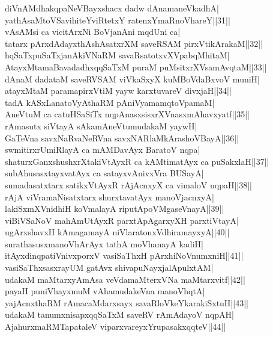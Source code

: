 \documentclass{article}
\begin{document}
diVnAMdhakqpaNeVBayxshacx dadw dAnamaneVkadhA|\\
yathAsaMtoVSavihiteYviRtetxY ratenxYmaRnoVhareY||31||\\
vAsAMsi ca vicitArxNi BoVjanAni mqdUni ca|\\
tatarx pArxdAdayxthAshAsatxrXM saveRSAM pirxVtikArakaM||32||\\
hqSaTxpuSaTxjanAkiVNaRM savaRsatotxvXVpabqMhitaM|\\
AtayxMtamaBavadadhxqqSaTxM puraM puMsitxrXVsamAvqtaM||33||\\
dAnaM dadataM saveRVSAM viVkaSxyX kuMBoVdaBxvoV muniH|\\
atayxMtaM paramapirxVtiM yayw karxtuvareV divxjaH||34||\\
tadA kASxLanatoVyAthaRM pAniVyamamqtoVpamaM|\\
AneVtuM ca catuHSaSiTx nqpAnasxsisxrXVnasxmAhavxyatf||35||\\
rAmasutx siVtayA sAkamAneVtumudakaM yaywH|\\
GaTeVna savxNaRvaNeRVna savxNARlaMkArashoVBayA||36||\\
swmitirxrUmiRlayA ca mAMDavAyx BaratoV nqpa|\\
shaturxGanxshushxrXtakiVtAyxR ca kAMtimatAyx ca puSakxlaH||37||\\
subAhusasxtayxvatAyx ca satayxvAnivxVra BUSayA|\\
sumadasatxtarx satikxVtAyxR rAjAcnxyX ca vimaloV nqpaH||38||\\
rAjA viVramaNisatxtarx shurxtavatAyx manoVjacnxyA|\\
lakiSxmXVnidhiH koVmalayA riputApoVMgaseVnayA||39||\\
viBiVSaNoV mahAmUtAyxR parxtApAgarxyXH parxtiVtayA|\\
ugArxshavxH kAmagamayA niVlaratonxVdhiramayxyA||40||\\
surathasusxmanoVhArAyx tathA moVhanayA kadiH|\\
itAyxdinqpatiVnivxporxV vasiSaThxH pArxhiNoVnumxniH||41||\\
vasiSaThxsasxrayUM gatAvx shivapuNayxjalApulxtAM|\\
udakaM maMtarxyAmAsa veVdamaMterxVNa maMtarxvitf||42||\\
payaH puniVhayxmuM vAhamudakeVna manoVhqtA|\\
yajAcnxthaRM rAmacaMdarxsayx savaRloVkeYkarakiSxtuH||43||\\
udakaM tanumxnisapxqqSaTxM saveRV rAmAdayoV nqpAH|\\
Aja{hu}rxmaRMTapataleV viparxvareyxYrupasakxqqteV||44||\\
\end{document}
